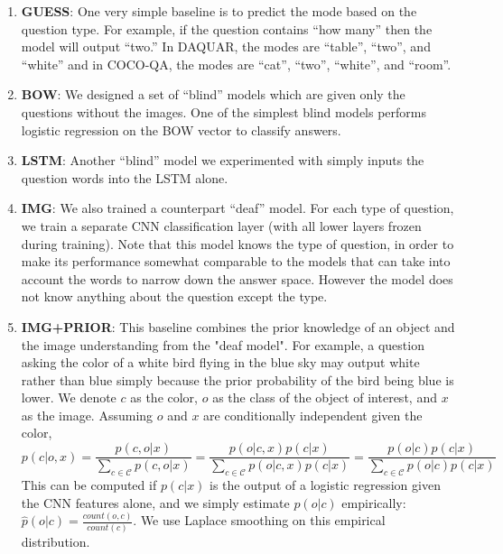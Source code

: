 \documentclass{article} %
\renewcommand{\#}[1]{\textbf{#1}}
\begin{document}
\begin{enumerate}[leftmargin=*]
\item \#{GUESS}:
One very simple baseline is to predict the mode based on the question type. For
example, if the question contains ``how many'' then the model will output
``two.'' In DAQUAR, the modes are ``table'', ``two'', and ``white'' and in
COCO-QA, the modes are ``cat'', ``two'', ``white'', and ``room''.

\item \#{BOW}:
We designed a set of ``blind'' models which
are given only the questions without the images. One of the simplest blind 
models performs logistic regression on the BOW vector to classify answers.

\item \#{LSTM}:
Another ``blind'' model we experimented with simply inputs the question words into
the LSTM alone.  

\item \#{IMG}:
We also trained a counterpart ``deaf'' model.
For each type of question, we train a separate CNN classification layer (with all
lower layers frozen during training). Note that this model knows the type
of question, in order to make its performance somewhat comparable to the
models that can take into account the words to narrow down the answer space.
However the model does not know anything about the question except the type. 

\item \#{IMG+PRIOR}:
This baseline combines the prior
knowledge of an object and the image understanding from the "deaf model". 
For example, a question
asking the color of a white bird flying in the blue sky may output
white rather than blue simply because 
the prior probability of the bird being blue is lower. 
We denote $c$ as the color,
$o$ as the class of the object of interest, and $x$ as the image. 
Assuming $o$ and $x$ are conditionally independent given the color,
\begin{equation}
p(c | o, x) = \frac{p(c, o | x)}{\sum_{c \in \mathcal{C}} p(c, o | x)} = 
\frac{p(o | c, x) p(c | x)}{\sum_{c \in \mathcal{C}} p(o | c, x) p(c | x)} = 
\frac{p(o | c) p(c | x)}{\sum_{c \in \mathcal{C}}p(o | c) p(c | x)}
\end{equation}
This can be computed if $p(c | x)$ is the output of a
logistic regression given the CNN features alone, and
we simply estimate $p(o | c)$ empirically:
$\hat{p}(o | c) = \frac{count(o, c)}{count(c)}$.
We use Laplace smoothing on this empirical distribution.
\end{enumerate}
\end{document}
